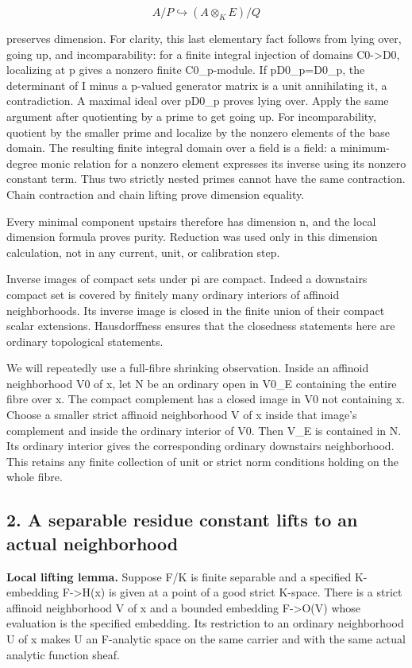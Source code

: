 \documentclass[
  10pt,
]{article}
\begin{document}
\[
 A/P\hookrightarrow (A\otimes_K E)/Q
\]

preserves dimension. For clarity, this last elementary fact follows from
lying over, going up, and incomparability: for a finite integral
injection of domains C0-\textgreater D0, localizing at p gives a nonzero
finite C0\_p-module. If pD0\_p=D0\_p, the determinant of I minus a
p-valued generator matrix is a unit annihilating it, a contradiction. A
maximal ideal over pD0\_p proves lying over. Apply the same argument
after quotienting by a prime to get going up. For incomparability,
quotient by the smaller prime and localize by the nonzero elements of
the base domain. The resulting finite integral domain over a field is a
field: a minimum-degree monic relation for a nonzero element expresses
its inverse using its nonzero constant term. Thus two strictly nested
primes cannot have the same contraction. Chain contraction and chain
lifting prove dimension equality.

Every minimal component upstairs therefore has dimension n, and the
local dimension formula proves purity. Reduction was used only in this
dimension calculation, not in any current, unit, or calibration step.

Inverse images of compact sets under pi are compact. Indeed a downstairs
compact set is covered by finitely many ordinary interiors of affinoid
neighborhoods. Its inverse image is closed in the finite union of their
compact scalar extensions. Hausdorffness ensures that the closedness
statements here are ordinary topological statements.

We will repeatedly use a full-fibre shrinking observation. Inside an
affinoid neighborhood V0 of x, let N be an ordinary open in V0\_E
containing the entire fibre over x. The compact complement has a closed
image in V0 not containing x. Choose a smaller strict affinoid
neighborhood V of x inside that image's complement and inside the
ordinary interior of V0. Then V\_E is contained in N. Its ordinary
interior gives the corresponding ordinary downstairs neighborhood. This
retains any finite collection of unit or strict norm conditions holding
on the whole fibre.

\subsection{2. A separable residue constant lifts to an actual
neighborhood}\label{a-separable-residue-constant-lifts-to-an-actual-neighborhood}

\textbf{Local lifting lemma.} Suppose F/K is finite separable and a
specified K-embedding F-\textgreater H(x) is given at a point of a good
strict K-space. There is a strict affinoid neighborhood V of x and a
bounded embedding F-\textgreater O(V) whose evaluation is the specified
embedding. Its restriction to an ordinary neighborhood U of x makes U an
F-analytic space on the same carrier and with the same actual analytic
function sheaf.
\end{document}
